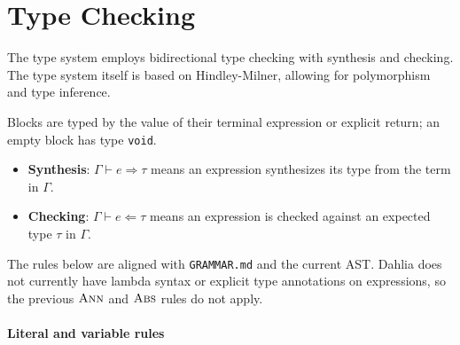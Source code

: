 \documentclass[11pt]{article}
\newcommand{\syn}{\Rightarrow} %
\newcommand{\chk}{\Leftarrow} %
\begin{document}
\section{Type Checking}
The type system employs bidirectional type checking with synthesis and checking.
The type system itself is based on Hindley-Milner, allowing for polymorphism and type inference.

Blocks are typed by the value of their terminal expression or explicit return; an empty block has type \texttt{void}.

\begin{itemize}
    \item \textbf{Synthesis}: $\Gamma \vdash e \syn \tau$ means an expression synthesizes its type from the term in $\Gamma$.
    \item \textbf{Checking}: $\Gamma \vdash e \chk \tau$ means an expression is checked against an expected type $\tau$ in $\Gamma$.
\end{itemize}

The rules below are aligned with \texttt{GRAMMAR.md} and the current AST. Dahlia does not currently have lambda syntax or explicit type annotations on expressions, so the previous $\textsc{Ann}$ and $\textsc{Abs}$ rules do not apply.

\paragraph{Literal and variable rules}
\end{document}
